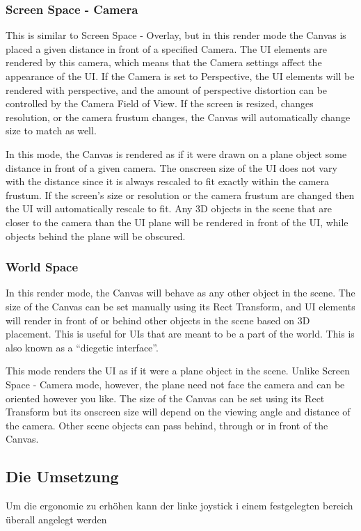 		\subsubsection{Screen Space - Camera}
			This is similar to Screen Space - Overlay, but in this render mode the Canvas is placed a given distance in front of a specified Camera. The UI elements are rendered by this camera, which means that the Camera settings affect the appearance of the UI. If the Camera is set to Perspective, the UI elements will be rendered with perspective, and the amount of perspective distortion can be controlled by the Camera Field of View. If the screen is resized, changes resolution, or the camera frustum changes, the Canvas will automatically change size to match as well.
			
			In this mode, the Canvas is rendered as if it were drawn on a plane object some distance in front of a given camera. The onscreen size of the UI does not vary with the distance since it is always rescaled to fit exactly within the camera frustum. If the screen’s size or resolution or the camera frustum are changed then the UI will automatically rescale to fit. Any 3D objects in the scene that are closer to the camera than the UI plane will be rendered in front of the UI, while objects behind the plane will be obscured.
		
		\subsubsection{World Space}
			In this render mode, the Canvas will behave as any other object in the scene. The size of the Canvas can be set manually using its Rect Transform, and UI elements will render in front of or behind other objects in the scene based on 3D placement. This is useful for UIs that are meant to be a part of the world. This is also known as a “diegetic interface”.
			
			This mode renders the UI as if it were a plane object in the scene. Unlike Screen Space - Camera mode, however, the plane need not face the camera and can be oriented however you like. The size of the Canvas can be set using its Rect Transform but its onscreen size will depend on the viewing angle and distance of the camera. Other scene objects can pass behind, through or in front of the Canvas.
			
	\subsection{Die Umsetzung}	
		Um die ergonomie zu erhöhen kann der linke joystick i einem festgelegten bereich überall angelegt werden
		
